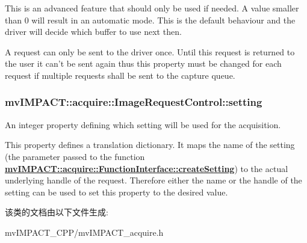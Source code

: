 This is an advanced feature that should only be used if needed. A value smaller than 0 will result in an automatic mode. This is the default behaviour and the driver will decide which buffer to use next then.

A request can only be sent to the driver once. Until this request is returned to the user it can't be sent again thus this property must be changed for each request if multiple requests shall be sent to the capture queue. \hypertarget{classmv_i_m_p_a_c_t_1_1acquire_1_1_image_request_control_acf18030a40a4c3ea66a14097f81a2652}{
\subsubsection[{setting}]{ mv\+I\+M\+P\+A\+C\+T\+::acquire\+::\+Image\+Request\+Control\+::setting}}\label{classmv_i_m_p_a_c_t_1_1acquire_1_1_image_request_control_acf18030a40a4c3ea66a14097f81a2652}


An integer property defining which setting will be used for the acquisition. 

This property defines a translation dictionary. It maps the name of the setting (the parameter passed to the function {\bfseries \hyperlink{classmv_i_m_p_a_c_t_1_1acquire_1_1_function_interface_a17e85331ed0965a52cff8b62279ef40c}{mv\+I\+M\+P\+A\+C\+T\+::acquire\+::\+Function\+Interface\+::create\+Setting}}) to the actual underlying handle of the request. Therefore either the name or the handle of the setting can be used to set this property to the desired value. 

该类的文档由以下文件生成\+:\begin{DoxyCompactItemize}
\item 
mv\+I\+M\+P\+A\+C\+T\+\_\+\+C\+P\+P/mv\+I\+M\+P\+A\+C\+T\+\_\+acquire.\+h\end{DoxyCompactItemize}
